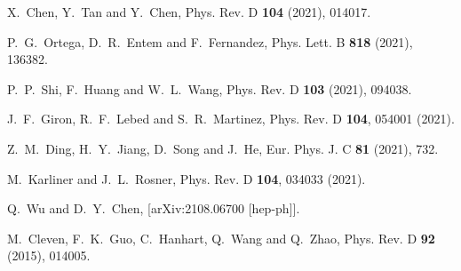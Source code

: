 \documentclass[preprint,12pt,3p]{elsarticle}
\begin{document}
\begin{thebibliography}{99}
X.~Chen, Y.~Tan and Y.~Chen,
Phys. Rev. D \textbf{104} (2021), 014017.



P.~G.~Ortega, D.~R.~Entem and F.~Fernandez,
Phys. Lett. B \textbf{818} (2021), 136382.

P.~P.~Shi, F.~Huang and W.~L.~Wang,
Phys. Rev. D \textbf{103} (2021), 094038.
%

J.~F.~Giron, R.~F.~Lebed and S.~R.~Martinez,
Phys. Rev. D \textbf{104}, 054001 (2021).

Z.~M.~Ding, H.~Y.~Jiang, D.~Song and J.~He,
Eur. Phys. J. C \textbf{81} (2021), 732.

M.~Karliner and J.~L.~Rosner,
Phys. Rev. D \textbf{104}, 034033 (2021).

Q.~Wu and D.~Y.~Chen,
[arXiv:2108.06700 [hep-ph]].

M.~Cleven, F.~K.~Guo, C.~Hanhart, Q.~Wang and Q.~Zhao,
Phys. Rev. D \textbf{92} (2015), 014005.


\end{thebibliography}
\end{document}
